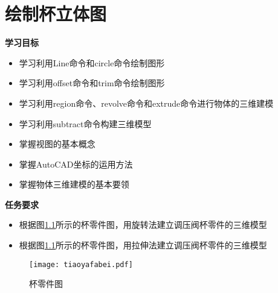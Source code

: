 \chapter{绘制杯立体图}\label{chap:bei}

{\bfseries 学习目标}
\begin{itemize}
\item 学习利用Line命令和circle命令绘制图形
\item 学习利用offset命令和trim命令绘制图形
\item 学习利用region命令、revolve命令和extrude命令进行物体的三维建模
\item 学习利用subtract命令构建三维模型
\item 掌握视图的基本概念
\item 掌握AutoCAD坐标的运用方法
\item 掌握物体三维建模的基本要领
\end{itemize}

{\bfseries 任务要求}
\begin{itemize}
\item 根据图\ref{fig:tiaoyafabei}所示的杯零件图，用旋转法建立调压阀杯零件的三维模型
\item 根据图\ref{fig:tiaoyafabei}所示的杯零件图，用拉伸法建立调压阀杯零件的三维模型
\end{itemize}

\noindent
\begin{figure}[htbp]
\centering
\texttt{[image: tiaoyafabei.pdf]}
\caption{杯零件图}\label{fig:tiaoyafabei}
\end{figure}
\endinput